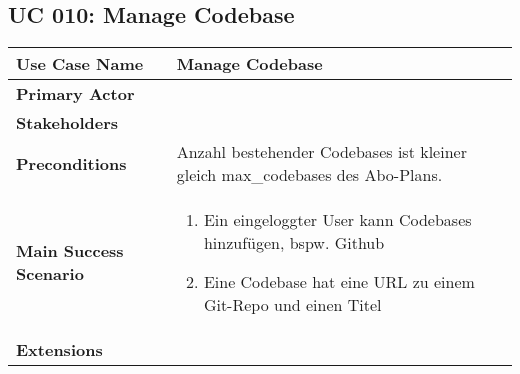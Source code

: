 \subsection{UC 010: Manage Codebase}
\label{uc:010-manage-codebase}

\begin{tabular}{|l|p{}|}
\hline
\textbf{Use Case Name} 	&	Manage Codebase	\\ \hline
\textbf{Primary Actor} 	&		\\ \hline
\textbf{Stakeholders}	&		\\ \hline
\textbf{Preconditions}	&	Anzahl bestehender Codebases ist kleiner gleich max_codebases des Abo-Plans.	\\ \hline
\textbf{Main Success Scenario}	&
\begin{enumerate}
	\item Ein eingeloggter User kann Codebases hinzufügen, bspw. Github
	\item Eine Codebase hat eine URL zu einem Git-Repo und einen Titel
\end{enumerate}
\\ \hline
\textbf{Extensions}	& 	\\ \hline
\end{tabular}
